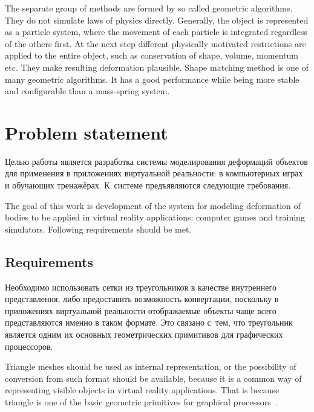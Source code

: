 \documentclass[a4paper, 12pt, titlepage]{extarticle}
\begin{document}
    The separate group of methods are formed by so called geometric algorithms. They do not simulate
    laws of physics directly. Generally, the object is represented as a particle system, where
    the movement of each particle is integrated regardless of the others first. At the next step
    different physically motivated restrictions are applied to the entire object, such as
    conservation of shape, volume, momentum etc. They make resulting deformation plausible. Shape
    matching method \cite{mueller-meshless} is one of many geometric algorithms. It has a good
    performance while being more stable and configurable than a mass-spring system.

  \section{Problem statement}\label{sec:task}

\begin{original}
    Целью работы является разработка системы моделирования деформаций объектов для применения в
    приложениях виртуальной реальности: в компьютерных играх и обучающих тренажёрах.
    К~системе предъявляются следующие требования.
\end{original}

    The goal of this work is development of the system for modeling deformation of bodies to be
    applied in virtual reality applications: computer games and training simulators.
    Following requirements should be met.

    \subsection{Requirements}

\begin{original}
    Необходимо использовать сетки из треугольников в качестве внутреннего представления, либо
    предоставить возможность конвертации, поскольку в приложениях виртуальной реальности отображаемые объекты
    чаще всего представляются именно в таком формате. Это связано с~тем, что треугольник является
    одним их основных геометрических примитивов для графических процессоров.~\cite{nvidia-tutorial}
\end{original}

    Triangle meshes should be used as internal representation, or the possibility of conversion from
    such format should be available, because it is a common way of representing visible objects in
    virtual reality applications. That is because triangle is one of the basic geometric primitives
    for graphical processors~\cite{nvidia-tutorial}.
\end{document}
